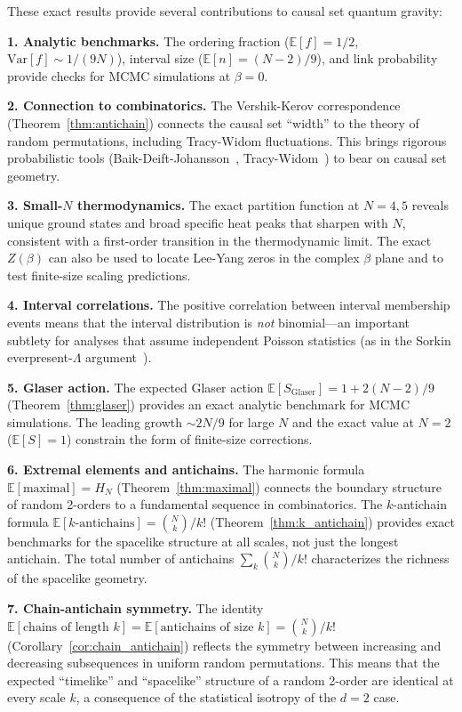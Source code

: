 \documentclass[aps,prd,twocolumn,superscriptaddress,nofootinbib]{revtex4-2}
\begin{document}
These exact results provide several contributions to causal set quantum gravity:

\textbf{1. Analytic benchmarks.} The ordering fraction ($\mathbb{E}[f] = 1/2$, $\mathrm{Var}[f] \sim 1/(9N)$), interval size ($\mathbb{E}[n] = (N-2)/9$), and link probability provide checks for MCMC simulations at $\beta = 0$.

\textbf{2. Connection to combinatorics.} The Vershik-Kerov correspondence (Theorem~\ref{thm:antichain}) connects the causal set ``width'' to the theory of random permutations, including Tracy-Widom fluctuations. This brings rigorous probabilistic tools (Baik-Deift-Johansson~\cite{baik1999}, Tracy-Widom~\cite{tracy1994}) to bear on causal set geometry.

\textbf{3. Small-$N$ thermodynamics.} The exact partition function at $N = 4, 5$ reveals unique ground states and broad specific heat peaks that sharpen with $N$, consistent with a first-order transition in the thermodynamic limit. The exact $Z(\beta)$ can also be used to locate Lee-Yang zeros in the complex $\beta$ plane and to test finite-size scaling predictions.

\textbf{4. Interval correlations.} The positive correlation between interval membership events means that the interval distribution is \emph{not} binomial---an important subtlety for analyses that assume independent Poisson statistics (as in the Sorkin everpresent-$\Lambda$ argument~\cite{ahmed2004}).

\textbf{5. Glaser action.} The expected Glaser action $\mathbb{E}[S_{\mathrm{Glaser}}] = 1 + 2(N-2)/9$ (Theorem~\ref{thm:glaser}) provides an exact analytic benchmark for MCMC simulations. The leading growth $\sim 2N/9$ for large $N$ and the exact value at $N = 2$ ($\mathbb{E}[S] = 1$) constrain the form of finite-size corrections.

\textbf{6. Extremal elements and antichains.} The harmonic formula $\mathbb{E}[\text{maximal}] = H_N$ (Theorem~\ref{thm:maximal}) connects the boundary structure of random 2-orders to a fundamental sequence in combinatorics. The $k$-antichain formula $\mathbb{E}[\text{$k$-antichains}] = \binom{N}{k}/k!$ (Theorem~\ref{thm:k_antichain}) provides exact benchmarks for the spacelike structure at all scales, not just the longest antichain. The total number of antichains $\sum_k \binom{N}{k}/k!$ characterizes the richness of the spacelike geometry.

\textbf{7. Chain-antichain symmetry.} The identity $\mathbb{E}[\text{chains of length } k] = \mathbb{E}[\text{antichains of size } k] = \binom{N}{k}/k!$ (Corollary~\ref{cor:chain_antichain}) reflects the symmetry between increasing and decreasing subsequences in uniform random permutations. This means that the expected ``timelike'' and ``spacelike'' structure of a random 2-order are identical at every scale $k$, a consequence of the statistical isotropy of the $d=2$ case.
\end{document}
